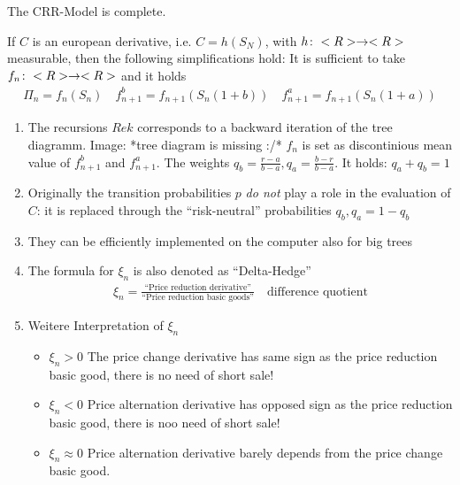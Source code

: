 \begin{conclusion}
    The CRR-Model is complete.
\end{conclusion}
\begin{conclusion}
	If $C$ is an european derivative, i.e. $C = h(S_N)$, with $h\colon <R> \to <R>$ measurable, then the following simplifications hold: It is sufficient to take $f_n \colon <R> \to <R>$ and it holds
	\begin{align*}
		\Pi_n = f_n(S_n) \quad f_{n+1}^b = f_{n+1}(S_n(1+b)) \quad f^a_{n+1} = f_{n+1}(S_n(1+a))
	\end{align*}
\end{conclusion}
\begin{*remark}
	\begin{enumerate}
		\item The recursions $Rek$ corresponds to a backward iteration of the tree diagramm. Image: *tree diagram is missing :/* $f_n$ is set as discontinious mean value of $f^b_{n+1}$ and $f^a_{n+1}$. The weights $q_b = \frac{r-a}{b-a},q_a = \frac{b-r}{b-a}$. It holds: $q_a + q_b = 1$
		\item Originally the transition probabilities $p$ \emph{do not} play a role in the evaluation of $C$: it is replaced through the ``risk-neutral'' probabilities $q_b, q_a = 1-q_b$
		\item They can be efficiently implemented on the computer also for big trees
		\item The formula for $\xi_n$ is also denoted as ``Delta-Hedge''
		\begin{align*}
			\xi_n = \frac{\text{``Price reduction derivative''}}{\text{``Price reduction basic goods''}} \quad \text{difference quotient}
		\end{align*}
		\item Weitere Interpretation of $\xi_n$
			\begin{itemize}
				\item $\xi_n > 0$ The price change derivative has same sign as the price reduction basic good, there is no need of short sale!
				\item $\xi_n < 0$ Price alternation derivative has opposed sign as the price reduction basic good, there is noo need of short sale!
				\item $\xi_n \approx 0$ Price alternation derivative barely depends from the price change basic good. 
			\end{itemize}
	\end{enumerate}
\end{*remark}
